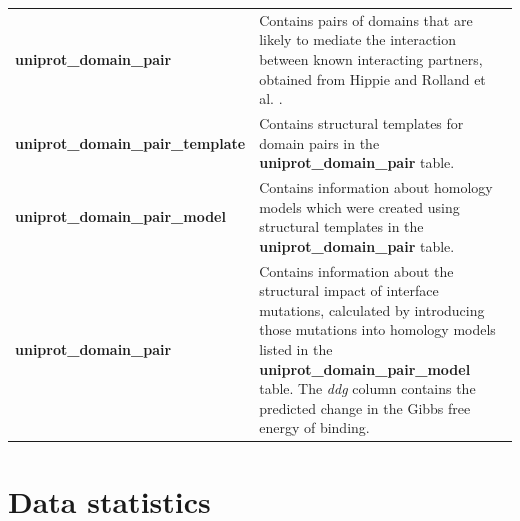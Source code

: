 \begin{table}[ht]
\begin{tabular}{l | p{10cm}}
	\textbf{uniprot\_domain\_pair} & Contains pairs of domains that are likely to mediate the interaction between known interacting partners, obtained from Hippie \cite{schaefer_hippie:_2012} and Rolland et al. \cite{rolland_proteome-scale_2014}. \\
	\textbf{uniprot\_domain\_pair\_template} & Contains structural templates for domain pairs in the \textbf{uniprot\_domain\_pair} table. \\
	\textbf{uniprot\_domain\_pair\_model} & Contains information about homology models which were created using structural templates in the \textbf{uniprot\_domain\_pair} table. \\
	\textbf{uniprot\_domain\_pair} & Contains information about the structural impact of interface mutations, calculated by introducing those mutations into homology models listed in the \textbf{uniprot\_domain\_pair\_model} table. The \textit{ddg} column contains the predicted change in the Gibbs free energy of binding. \\
	\bottomrule
\end{tabular}
\end{table}



\section{Data statistics}

